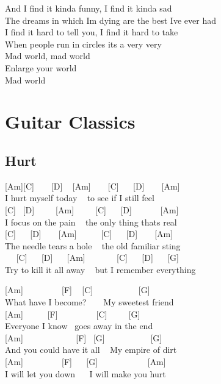 \documentclass[
  letterpaper,
  twoside=false]{scrbook}
\begin{document}
And I find it kinda funny, I find it kinda sad\\
The dreams in which I\textquotesingle m dying are the best
I\textquotesingle ve ever had\\
I find it hard to tell you, I find it hard to take\\
When people run in circles it\textquotesingle s a very very\\
Mad world, mad world\\
Enlarge your world\\
Mad world

\part{Guitar Classics}

\hypertarget{hurt}{%
\chapter{Hurt}\label{hurt}}

{[}Am{]}{[}C{]} ~ ~ {[}D{]} ~ {[}Am{]} ~ ~ {[}C{]} ~ ~{[}D{]} ~ ~
{[}Am{]}\\
\hspace*{0.333em} I hurt myself today ~ to see if I still feel\\
{[}C{]} ~{[}D{]} ~ ~ ~{[}Am{]} ~ ~ ~{[}C{]} ~ ~{[}D{]} ~ ~ ~ ~{[}Am{]}\\
I focus on the pain ~ the only thing that\textquotesingle s real\\
\hspace*{0.333em} {[}C{]} ~ ~{[}D{]} ~ ~ {[}Am{]} ~ ~ ~ {[}C{]} ~
~{[}D{]} ~ ~ {[}Am{]}\\
The needle tears a hole ~ the old familiar sting\\
\hspace*{0.333em} ~ ~{[}C{]} ~ ~{[}D{]} ~ ~{[}Am{]} ~ ~ ~ ~ {[}C{]} ~
~{[}D{]} ~ ~{[}G{]} ~ ~ ~ ~\\
Try to kill it all away ~ but I remember everything

{[}Am{]} ~ ~ ~ ~ ~ {[}F{]} ~ {[}C{]} ~ ~ ~ ~ ~ ~ {[}G{]}\\
What have I become? ~ ~ My sweetest friend\\
{[}Am{]} ~ ~ ~ {[}F{]} ~ ~ ~ ~ ~ {[}C{]} ~ ~ ~{[}G{]}\\
Everyone I know ~goes away in the end\\
\hspace*{0.333em} {[}Am{]} ~ ~ ~ ~ ~ ~ ~ {[}F{]} ~{[}G{]} ~ ~ ~ ~ ~ ~
{[}G{]}\\
And you could have it all ~ My empire of dirt\\
{[}Am{]} ~ ~ ~ ~ ~ {[}F{]} ~ ~{[}G{]} ~ ~ ~ ~ ~ ~ ~{[}Am{]}\\
I will let you down ~ ~I will make you hurt
\end{document}
